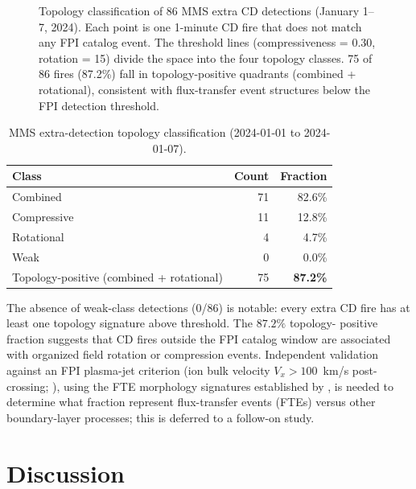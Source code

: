 \documentclass[draft]{agujournal2025}
\let\citet\citeA%
\begin{document}
\begin{figure}[htbp]
  \centering
  
  \caption{Topology classification of 86 MMS extra CD detections
    (January 1--7, 2024).  Each point is one 1-minute CD fire that does not
    match any FPI catalog event.  The threshold lines (compressiveness = 0.30,
    rotation = 15\textdegree) divide the space into the four topology classes.
    75 of 86 fires (87.2\%) fall in topology-positive quadrants (combined +
    rotational), consistent with flux-transfer event structures below the FPI
    detection threshold.}
  \label{fig:fte_scatter}
\end{figure}

\begin{table}[htbp]
  \centering
  \caption{MMS extra-detection topology classification (2024-01-01 to 2024-01-07).}
  \label{tab:fte}
  \begin{tabular}{lrr}
    \toprule
    Class      & Count & Fraction \\
    \midrule
    Combined   & 71 & 82.6\% \\
    Compressive & 11 & 12.8\% \\
    Rotational &  4 &  4.7\% \\
    Weak       &  0 &  0.0\% \\
    \midrule
    Topology-positive (combined + rotational) & 75 & \textbf{87.2\%} \\
    \bottomrule
  \end{tabular}
\end{table}

The absence of weak-class detections (0/86) is notable: every extra CD fire
has at least one topology signature above threshold.  The $87.2\%$ topology-
positive fraction suggests that CD fires outside the FPI catalog window are
associated with organized field rotation or compression events.
Independent validation against an FPI plasma-jet criterion (ion bulk velocity
$V_x > 100$~km/s post-crossing; \citet{eastwood2016}), using the FTE morphology
signatures established by \citet{russell1978}, is needed to
determine what fraction represent flux-transfer events (FTEs) versus other
boundary-layer processes; this is deferred to a follow-on study.

\section{Discussion}
\label{sec:discussion}
\end{document}
